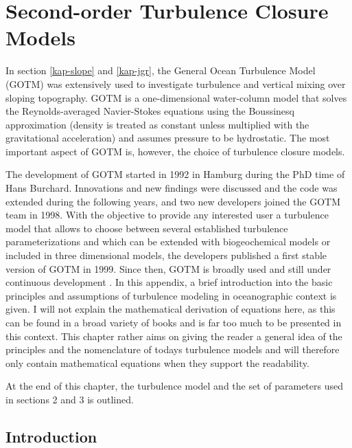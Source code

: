 \chapter{Second-order Turbulence Closure Models}

In section \ref{kap-slope} and \ref{kap-jgr}, the General Ocean Turbulence Model 
(GOTM) was extensively used to investigate turbulence and vertical mixing over 
sloping topography. GOTM is a one-dimensional water-column model that solves 
the Reynolds-averaged Navier-Stokes equations using the Boussinesq approximation 
(density is treated as constant unless multiplied with the gravitational 
acceleration) and assumes pressure to be hydrostatic. The most important aspect 
of GOTM is, however, the choice of turbulence closure models. 

The development of 
GOTM started in 1992 in Hamburg during 
the PhD time of Hans Burchard. Innovations and new findings were discussed and 
the code was extended during the following years, and two new developers joined 
the GOTM team in 1998. With the objective to provide any interested user a 
turbulence model that allows to choose between several established turbulence 
parameterizations and which can be extended with biogeochemical models or 
included in three dimensional models, the developers published a first stable 
version of GOTM in 1999. Since then, GOTM is broadly used and still under 
continuous development \citep[][]{gotm1999}. In this appendix, a brief 
introduction into the basic principles and assumptions of turbulence modeling 
in 
oceanographic context is given. I will not explain the mathematical derivation 
of equations here, as this can be found in a broad variety of books and is far 
too much to be presented in this context. This chapter rather aims on giving 
the reader a general idea of the principles and the nomenclature of todays 
turbulence models and will therefore only contain mathematical equations when 
they support the readability.

At the end of this chapter, the turbulence model and the set of parameters used 
in sections 2 and 3 is outlined.  

\section{Introduction}\label{introturbm}

